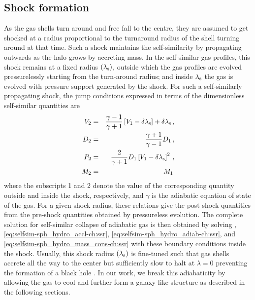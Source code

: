 \subsection{Shock formation}%
As the gas shells turn around and free fall to the centre, they are assumed to get shocked at a radius proportional to the turnaround radius of the shell turning around at that time. Such a shock maintains the self-similarity by 
propagating outwards as the halo grows by accreting mass.
In the self-similar gas profiles, this shock remains at a fixed radius $(\lambda_{\rm s})$, outside which the gas profiles are evolved pressurelessly starting from the turn-around radius;
and inside $\lambda_{\rm s}$ the gas is evolved with pressure support generated by the shock.
For such a self-similarly propagating shock, the jump conditions \cite{1985Bertschinger} expressed in terms of the dimensionless self-similar quantities are 
\begin{eqnarray}
\label{eq:shock_jump_selfsim-ch:ssr}
V_2 &=& \frac{\gamma -1}{\gamma +1} \left[ V_1-\delta \lambda _{\rm s} \right] + \delta \lambda _{\rm s} \,,\nonumber\\
D_2 &=& \frac{\gamma +1}{\gamma -1} D_1 \,,\nonumber\\
P_2 &=& \frac{2}{\gamma +1} D_1 \left[ V_1-\delta \lambda _{\rm s} \right]^2 \,,\nonumber\\
M_2 &=& M_1 \,
\end{eqnarray}
where the subscripts 1 and 2 denote the value of the corresponding quantity outside and inside the shock, respectively, and $\gamma$ is the adiabatic equation of state of the gas. %
For a given shock radius, these relations give the post-shock quantities from the pre-shock quantities obtained by pressureless evolution. 
The complete solution for self-similar collapse of adiabatic gas is then obtained by solving , \eqref{eq:selfsim-sph_hydro_accl-ch:ssr}, \eqref{eq:selfsim-sph_hydro_adiab-ch:ssr}, and \eqref{eq:selfsim-sph_hydro_mass_cons-ch:ssr} with these boundary conditions inside the shock.
Usually, this shock radius $(\lambda_{\rm s})$ is fine-tuned such that gas shells accrete all the way to the center but sufficiently slow to halt at $\lambda=0$ preventing the formation of a black hole \cite{1985Bertschinger}. In our work, we break this adiabaticity by allowing the gas to cool and further form a galaxy-like structure as described in the following sections.









